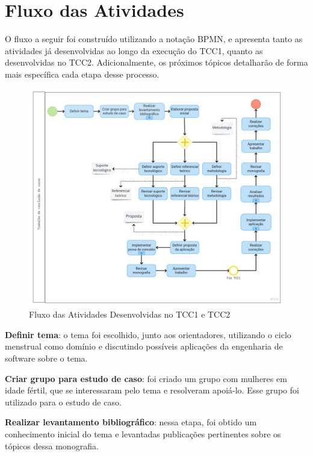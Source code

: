 \section{Fluxo das Atividades}

O fluxo a seguir foi construído utilizando a notação BPMN, e apresenta 
tanto as atividades já desenvolvidas ao longo da execução do 
TCC1, quanto as desenvolvidas no TCC2. 
Adicionalmente, os próximos tópicos detalharão de 
forma mais específica cada etapa desse processo.

\begin{figure}[ht]
	\centering
	\includegraphics[keepaspectratio=true,scale=0.55]{figuras/fluxodeatividades.pdf}
	\caption{Fluxo das Atividades Desenvolvidas no TCC1 e TCC2}
        \label{fig03}
\end{figure}

\textbf{Definir tema}: o tema foi escolhido, junto aos orientadores, utilizando o ciclo 
menstrual como domínio e discutindo
possíveis aplicações da engenharia de software sobre o tema. 

\textbf{Criar grupo para estudo de caso}: foi criado um grupo com mulheres em idade 
fértil, 
que se interessaram pelo tema e resolveram apoiá-lo. Esse grupo foi utilizado 
para o estudo de caso.

\textbf{Realizar levantamento bibliográfico}: nessa etapa, foi obtido um conhecimento 
inicial do tema e levantadas publicações pertinentes sobre os tópicos dessa monografia. 

